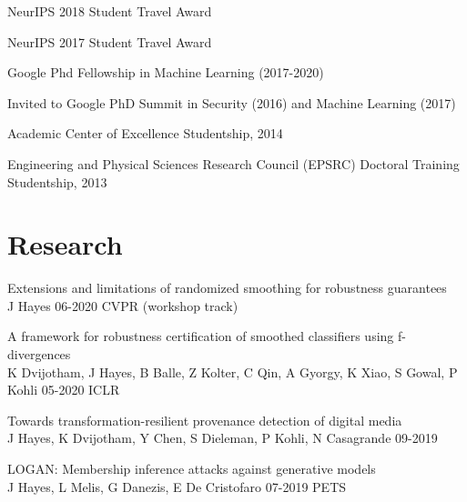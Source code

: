 \documentclass[margin,line]{res}
\begin{document}
\begin{resume}


NeurIPS 2018 Student Travel Award\newline

\vspace*{-3mm}

NeurIPS 2017 Student Travel Award\newline

\vspace*{-3mm}

Google Phd Fellowship in Machine Learning (2017-2020)\newline

\vspace*{-3mm}

\noindent Invited to Google PhD Summit in Security (2016) and Machine
Learning (2017)\newline

\vspace*{-3mm}

Academic Center of Excellence Studentship, 2014\newline

\vspace*{-3mm}

Engineering and Physical Sciences Research Council (EPSRC) Doctoral
Training Studentship, 2013


\section{\sc Research}

Extensions and limitations of randomized smoothing for robustness guarantees\\
J Hayes 06-2020 CVPR (workshop track)  

A framework for robustness certification of smoothed classifiers using f-divergences\\
K Dvijotham, J Hayes, B Balle, Z Kolter, C Qin, A Gyorgy, K Xiao, S Gowal, P Kohli 05-2020 ICLR

Towards transformation-resilient provenance detection of digital media\\
J Hayes, K Dvijotham, Y Chen, S Dieleman, P Kohli, N Casagrande 09-2019  

LOGAN: Membership inference attacks against generative models\\
J Hayes, L Melis, G Danezis, E De Cristofaro 07-2019 PETS  


\end{resume}
\end{document}
